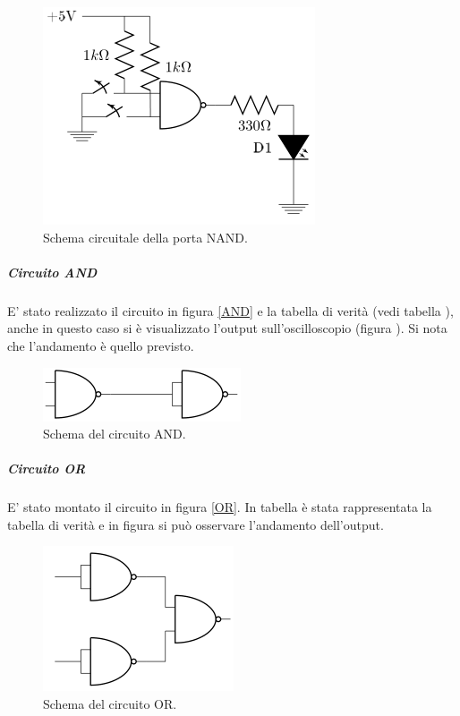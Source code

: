 \documentclass[10pt,a4paper]{article}
\begin{document}
\begin{figure}[!htb]
  \centering
  \includegraphics[scale=0.5]{NAND.png}
\caption{Schema circuitale della porta NAND.\label{NAND}}
\label{pin}
\end{figure}

\subparagraph{Circuito AND}
E' stato realizzato il circuito in figura \ref{AND} e la tabella di verità (vedi tabella ), anche in questo caso si è visualizzato l'output sull'oscilloscopio (figura ). Si nota che l'andamento è quello previsto.

\begin{figure}[!htb]
  \centering
  \includegraphics[scale=0.5]{AND.png}
\caption{Schema del circuito AND.\label{AND}}
\label{pin}
\end{figure}

\subparagraph{Circuito OR}
E' stato montato il circuito in figura \ref{OR}. In tabella  è stata rappresentata la tabella di verità e in figura  si può osservare l'andamento dell'output.

\begin{figure}[!htb]
  \centering
  \includegraphics[scale=0.5]{OR.png}
\caption{Schema del circuito OR.\label{OR}}
\label{pin}
\end{figure}
\end{document}
